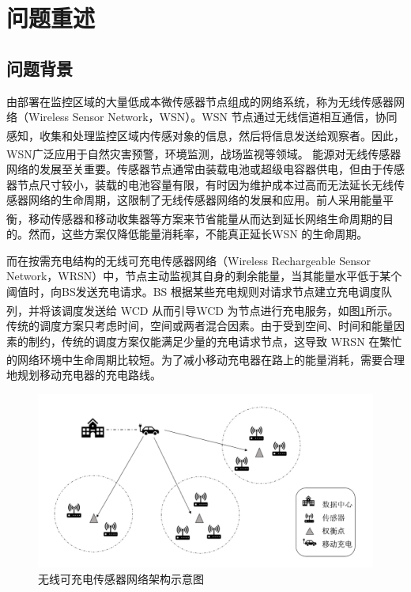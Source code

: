 \documentclass{whutmod}
\newcommand{\upcite}[1]{\textsuperscript{\cite{#1}}}
\begin{document}
	\section{问题重述}	
		\subsection{问题背景}
	    	由部署在监控区域的大量低成本微传感器节点组成的网络系统，称为无线传感器网络（Wireless Sensor Network，WSN）。WSN 节点通过无线信道相互通信，协同感知，收集和处理监控区域内传感对象的信息，然后将信息发送给观察者\upcite{1}。因此，WSN广泛应用于自然灾害预警，环境监测，战场监视等领域\upcite{2}。
	    	能源对无线传感器网络的发展至关重要。传感器节点通常由装载电池或超级电容器供电，但由于传感器节点尺寸较小，装载的电池容量有限，有时因为维护成本过高而无法延长无线传感器网络的生命周期，这限制了无线传感器网络的发展和应用。前人采用能量平衡\upcite{4,5}，移动传感器\upcite{6,7}和移动收集器等方案来节省能量从而达到延长网络生命周期的目的。然而，这些方案仅降低能量消耗率，不能真正延长WSN 的生命周期。

	    	
	    	而在按需充电结构的无线可充电传感器网络（Wireless Rechargeable Sensor Network，WRSN）中，节点主动监视其自身的剩余能量，当其能量水平低于某个阈值时，向BS发送充电请求。BS 根据某些充电规则对请求节点建立充电调度队列，并将该调度发送给 WCD 从而引导WCD 为节点进行充电服务\upcite{3}，如图\ref{lasbel}所示。传统的调度方案只考虑时间，空间或两者混合因素。由于受到空间、时间和能量因素的制约，传统的调度方案仅能满足少量的充电请求节点，这导致 WRSN 在繁忙的网络环境中生命周期比较短\upcite{3}。为了减小移动充电器在路上的能量消耗，需要合理地规划移动充电器的充电路线。
				\begin{figure}[H]
		\centering
		\includegraphics[width=\textwidth]{figures/demo.png}
		\caption{无线可充电传感器网络架构示意图}\label{lasbel}
	\end{figure}
	
\end{document}
